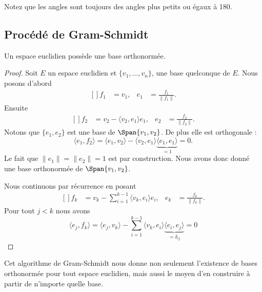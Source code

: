 Notez que les angles sont toujours des angles plus petits ou égaux à \unit{180}{\degree}.

\subsection{Procédé de Gram-Schmidt}

\begin{proposition}    \label{PropUMtEqkb}
    Un espace euclidien possède une base orthonormée.
\end{proposition}

\begin{proof}
    Soit \( E\) un espace euclidien et \( \{ v_1,\ldots, v_n \}\), une base quelconque de \( E\). Nous posons d'abord
    \begin{equation}
        \begin{aligned}[]
            f_1&=v_1,&e_1&=\frac{ f_1 }{ \| f_1 \| }.
        \end{aligned}
    \end{equation}
    Ensuite
    \begin{equation}
        \begin{aligned}[]
            f_2&=v_2-\langle v_2, e_1\rangle e_1,&e_2&=\frac{ f_2 }{ \| f_2 \| }.
        \end{aligned}
    \end{equation}
    Notons que \( \{ e_1,e_2 \}\) est une base de \( \Span\{ v_1,v_2 \}\). De plus elle est orthogonale :
    \begin{equation}
        \langle e_1, f_2\rangle =\langle e_1, v_2\rangle -\langle v_2, e_1\rangle \underbrace{\langle e_1, e_1\rangle}_{=1} =0.
    \end{equation}
    Le fait que \( \| e_1 \|=\| e_2 \|=1\) est par construction. Nous avons donc donné une base orthonormée de \( \Span\{ v_1,v_2 \}\).

    Nous continuons par récurrence en posant
    \begin{equation}
        \begin{aligned}[]
            f_k&=v_k-\sum_{i=1}^{k-1}\langle v_k, e_i\rangle e_i,&e_k&=\frac{ f_k }{ \| f_k \| }.
        \end{aligned}
    \end{equation}
    Pour tout \( j<k\) nous avons
    \begin{equation}
        \langle e_j, f_k\rangle =\langle e_j, v_k\rangle -\sum_{i=1}^{k-1}\langle v_k, e_i\rangle \underbrace{\langle e_i, e_j\rangle}_{=\delta_{ij}} =0
    \end{equation}
\end{proof}
Cet algorithme de Gram-Schmidt nous donne non seulement l'existence de bases orthonormée pour tout espace euclidien, mais aussi le moyen d'en construire à partir de n'importe quelle base.


